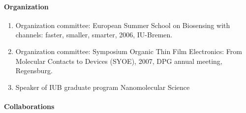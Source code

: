\paragraph{Organization}
\begin{enumerate}
\item Organization committee: European Summer School on Biosensing
  with channels: faster, smaller, smarter, 2006, IU-Bremen. %
\item Organization committee: Symposium Organic Thin Film
Electronics: From Molecular Contacts to Devices (SYOE), 2007, DPG annual meeting, Regensburg. %
\item Speaker of IUB graduate program Nanomolecular Science
\end{enumerate}

\paragraph{Collaborations}

